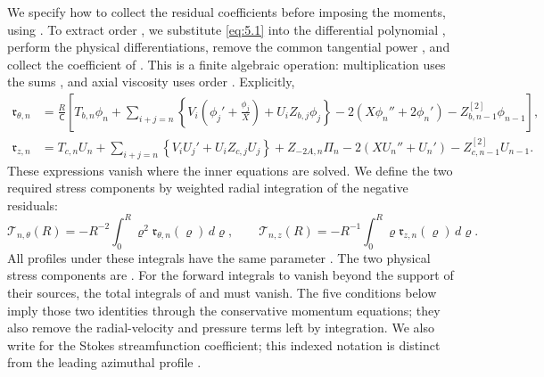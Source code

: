 We specify how to collect the residual coefficients before imposing the moments, using
. To extract order , we substitute \eqref{eq:5.1} into the differential
polynomial , perform the physical differentiations, remove the common tangential power
, and collect the coefficient of . This is a finite algebraic
operation: multiplication uses the sums , and axial viscosity uses order
. Explicitly,
\[
\begin{aligned}
\mathfrak r_{\theta,n}
  &=\frac{R}{\mathsf C}\left[
      T_{b,n}\phi_n
      +\sum_{i+j=n}\left\{V_i\left(\phi_j'+\frac{\phi_j}{X}\right)+U_iZ_{b,j}\phi_j\right\}
      -2\left(X\phi_n''+2\phi_n'\right)
      -Z_{b,n-1}^{[2]}\phi_{n-1}
    \right],\\
\mathfrak r_{z,n}
  &=T_{c,n}U_n
      +\sum_{i+j=n}\left\{V_iU_j'+U_iZ_{c,j}U_j\right\}
      +Z_{-2A,n}\Pi_n
      -2\left(XU_n''+U_n'\right)
      -Z_{c,n-1}^{[2]}U_{n-1}.
\end{aligned}
\]
These expressions vanish where the inner equations are solved. We define the two required stress
components by weighted radial integration of the negative residuals:
\begin{equation}\label{eq:5.9}
\mathcal T_{n,\theta}(R)=-R^{-2}\int_0^R\varrho^2\mathfrak r_{\theta,n}(\varrho)\,d\varrho,
\qquad
\mathcal T_{n,z}(R)=-R^{-1}\int_0^R\varrho\mathfrak r_{z,n}(\varrho)\,d\varrho.
\tag{5.9}
\end{equation}
All profiles under these integrals have the same parameter . The two physical stress
components are . For the forward integrals to vanish beyond the support
of their sources, the total integrals of  and
 must vanish. The five conditions below imply those two identities through
the conservative momentum equations; they also remove the radial-velocity and pressure terms left by
integration. We also write  for the Stokes
streamfunction coefficient; this indexed notation is distinct from the leading azimuthal profile
.

